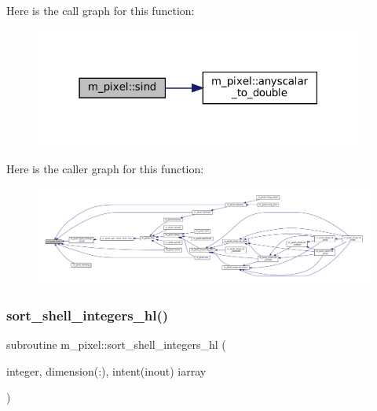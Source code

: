 Here is the call graph for this function\+:
\nopagebreak
\begin{figure}[H]
\begin{center}
\leavevmode
\includegraphics[width=307pt]{namespacem__pixel_a3ef23ce0230c47b30cb627ebd439daae_cgraph}
\end{center}
\end{figure}
Here is the caller graph for this function\+:
\nopagebreak
\begin{figure}[H]
\begin{center}
\leavevmode
\includegraphics[width=350pt]{namespacem__pixel_a3ef23ce0230c47b30cb627ebd439daae_icgraph}
\end{center}
\end{figure}
\mbox{\label{namespacem__pixel_a4396c3ff36a080fbbfa859348203d0c7}} 
\subsubsection{\texorpdfstring{sort\+\_\+shell\+\_\+integers\+\_\+hl()}{sort\_shell\_integers\_hl()}}
{\footnotesize\ttfamily subroutine m\+\_\+pixel\+::sort\+\_\+shell\+\_\+integers\+\_\+hl (\begin{DoxyParamCaption}\item[{integer, dimension(\+:), intent(inout)}]{iarray }\end{DoxyParamCaption})\hspace{0.3cm}{\ttfamily [private]}}



